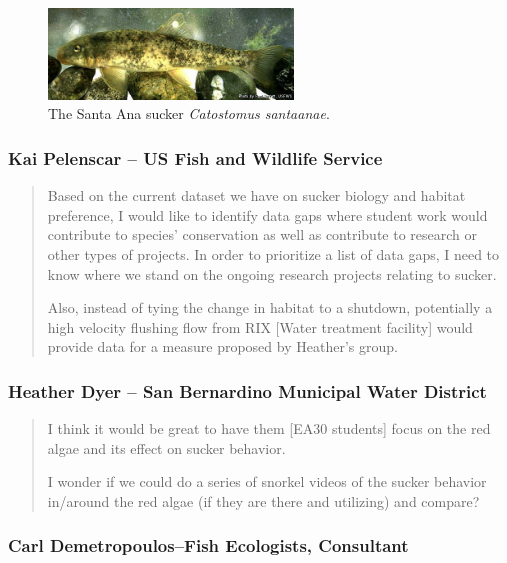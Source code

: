 \documentclass{article}\usepackage[]{graphicx}\usepackage[]{color}
\begin{document}
\begin{figure}
   \includegraphics[width=0.58\textwidth]{Catostomus_santaanae.jpg}
  \caption{The Santa Ana sucker \emph{Catostomus santaanae}.}
\end{figure}

\subsubsection{Kai Pelenscar -- US Fish and Wildlife Service}

\begin{quote}
Based on the current dataset we have on sucker biology and habitat preference, I would like to identify data gaps where student work would contribute to species' conservation as well as contribute to research or other types of projects. In order to prioritize a list of data gaps, I need to know where we stand on the ongoing research projects relating to sucker.

Also, instead of tying the change in habitat to a shutdown, potentially a high velocity flushing flow from RIX [Water treatment facility] would provide data for a measure proposed by Heather's group. 
\end{quote}

\subsubsection{Heather Dyer -- San Bernardino Municipal Water District}

\begin{quote}
I think it would be great to have them [EA30 students] focus on the red algae and its effect on sucker behavior.  

I wonder if we could do a series of snorkel videos of the sucker behavior in/around the red algae (if they are there and utilizing) and compare?

\end{quote}

\subsubsection{Carl Demetropoulos--Fish Ecologists, Consultant}
\end{document}
